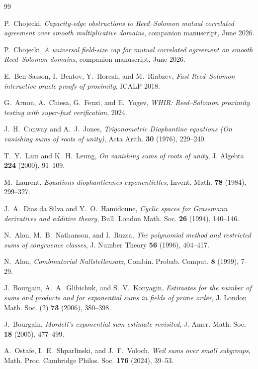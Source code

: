 \documentclass[11pt]{article}
\theoremstyle{definition}
\begin{document}
\begin{thebibliography}{99}

P.~Chojecki,
\emph{Capacity-edge obstructions to Reed--Solomon mutual correlated agreement over smooth multiplicative domains},
companion manuscript, June 2026.

P.~Chojecki,
\emph{A universal field-size cap for mutual correlated agreement on smooth Reed--Solomon domains},
companion manuscript, June 2026.

E.~Ben-Sasson, I.~Bentov, Y.~Horesh, and M.~Riabzev,
\emph{Fast Reed--Solomon interactive oracle proofs of proximity}, ICALP 2018.

G.~Arnon, A.~Chiesa, G.~Fenzi, and E.~Yogev,
\emph{WHIR: Reed--Solomon proximity testing with super-fast verification}, 2024.

J.~H.~Conway and A.~J.~Jones,
\emph{Trigonometric Diophantine equations (On vanishing sums of roots of unity)},
Acta Arith. \textbf{30} (1976), 229--240.

T.~Y.~Lam and K.~H.~Leung,
\emph{On vanishing sums of roots of unity},
J. Algebra \textbf{224} (2000), 91--109.

M.~Laurent,
\emph{Equations diophantiennes exponentielles},
Invent. Math. \textbf{78} (1984), 299--327.

J.~A.~Dias da Silva and Y.~O.~Hamidoune,
\emph{Cyclic spaces for Grassmann derivatives and additive theory},
Bull. London Math. Soc. \textbf{26} (1994), 140--146.

N.~Alon, M.~B.~Nathanson, and I.~Ruzsa,
\emph{The polynomial method and restricted sums of congruence classes},
J. Number Theory \textbf{56} (1996), 404--417.

N.~Alon,
\emph{Combinatorial Nullstellensatz},
Combin. Probab. Comput. \textbf{8} (1999), 7--29.

J.~Bourgain, A.~A.~Glibichuk, and S.~V.~Konyagin,
\emph{Estimates for the number of sums and products and for exponential sums in fields of prime order},
J. London Math. Soc. (2) \textbf{73} (2006), 380--398.

J.~Bourgain,
\emph{Mordell's exponential sum estimate revisited},
J. Amer. Math. Soc. \textbf{18} (2005), 477--499.

A.~Ostafe, I.~E.~Shparlinski, and J.~F.~Voloch,
\emph{Weil sums over small subgroups},
Math. Proc. Cambridge Philos. Soc. \textbf{176} (2024), 39--53.


\end{thebibliography}
\end{document}
